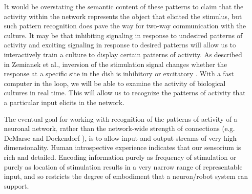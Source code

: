 \documentclass[letterpaper]{article}
\begin{document}
It would be overstating the semantic content of these patterns to claim that the activity within the network represents the object that elicited the stimulus, but such pattern recognition does pave the way for two-way communication with the culture.
It may be that inhibiting signaling in response to undesired patterns of activity and exciting signaling in response to desired patterns will allow us to interactively train a culture to display certain patterns of activity. 
As described in Zemianek et al., inversion of the stimulation signal changes whether the response at a specific site in the dish is inhibitory or excitatory .
With a fast computer in the loop, we will be able to examine the activity of biological cultures in real time. 
This will allow us to recognize the patterns of activity that a particular input elicits in the network. 

The eventual goal for working with recognition of the patterns of activity of a neuronal network, rather than the network-wide strength of connections (e.g. DeMarse and Dockendorf ), is to allow input and output streams of very high dimensionality.
Human introspective experience indicates that our sensorium is rich and detailed.
Encoding information purely as frequency of stimulation or purely as location of stimulation results in a very narrow range of representable input, and so restricts the degree of embodiment that a neuron/robot system can support.




\end{document}
